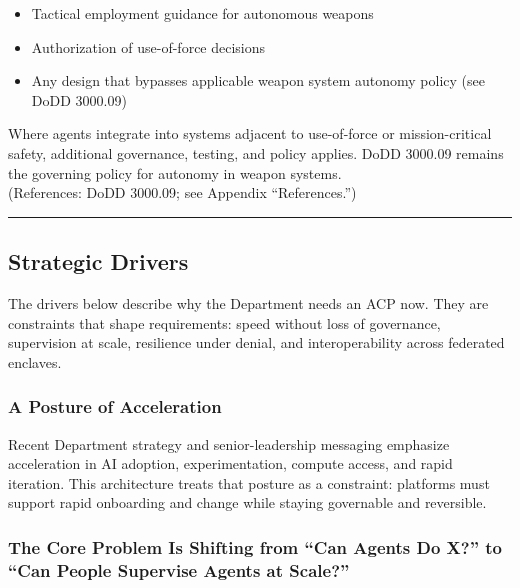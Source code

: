 \documentclass[11pt]{article}
\begin{document}
\begin{itemize}
\tightlist
\item
  Tactical employment guidance for autonomous weapons
\item
  Authorization of use-of-force decisions
\item
  Any design that bypasses applicable weapon system autonomy policy (see
  DoDD 3000.09)
\end{itemize}

Where agents integrate into systems adjacent to use-of-force or
mission-critical safety, additional governance, testing, and policy
applies. DoDD 3000.09 remains the governing policy for autonomy in
weapon systems.\\
(References: DoDD 3000.09; see Appendix ``References.'')

\vspace{2pt}\begin{center}\rule{0.62\linewidth}{0.6pt}\end{center}\vspace{2pt}

\hypertarget{strategic-drivers}{%
\subsection{Strategic Drivers}\label{strategic-drivers}}

The drivers below describe why the Department needs an ACP now. They are
constraints that shape requirements: speed without loss of governance,
supervision at scale, resilience under denial, and interoperability
across federated enclaves.

\hypertarget{a-posture-of-acceleration}{%
\subsubsection{A Posture of Acceleration}\label{a-posture-of-acceleration}}

Recent Department strategy and senior-leadership messaging emphasize
acceleration in AI adoption, experimentation, compute access, and rapid
iteration. This architecture treats that posture as a constraint:
platforms must support rapid onboarding and change while staying
governable and reversible.

\hypertarget{the-core-problem-is-shifting-from-can-agents-do-x-to-can-people-supervise-agents-at-scale}{%
\subsubsection{The Core Problem Is Shifting from ``Can Agents Do X?'' to ``Can People Supervise Agents at Scale?''}\label{the-core-problem-is-shifting-from-can-agents-do-x-to-can-people-supervise-agents-at-scale}}
\end{document}
